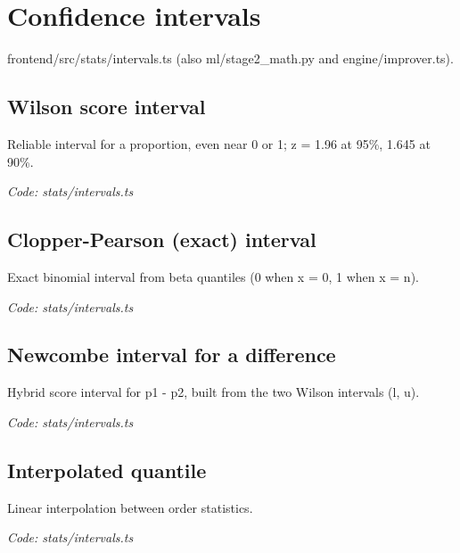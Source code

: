 \documentclass[11pt,a4paper]{article}
\newcommand{\where}[1]{\par{\small\itshape\color{mute}Code: #1}\par}
\begin{document}
\clearpage
\section{Confidence intervals}
{\color{mute}frontend/src/stats/intervals.ts (also ml/stage2\_math.py and engine/improver.ts).}

\subsection*{Wilson score interval}
\par\smallskip\noindent{}\par\smallskip
Reliable interval for a proportion, even near 0 or 1; z = 1.96 at 95\%, 1.645 at 90\%.
\where{stats/intervals.ts}

\subsection*{Clopper-Pearson (exact) interval}
\par\smallskip\noindent{}\par\smallskip
Exact binomial interval from beta quantiles (0 when x = 0, 1 when x = n).
\where{stats/intervals.ts}

\subsection*{Newcombe interval for a difference}
\par\smallskip\noindent{}\par\smallskip
Hybrid score interval for p1 - p2, built from the two Wilson intervals (l, u).
\where{stats/intervals.ts}

\subsection*{Interpolated quantile}
\par\smallskip\noindent{}\par\smallskip
Linear interpolation between order statistics.
\where{stats/intervals.ts}
\end{document}
